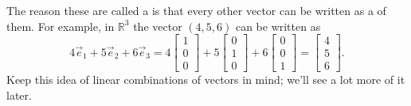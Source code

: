 The reason these are called a \emph{} is that every other
vector can be written as a \emph{} of them.
For example, in ${\mathbb R}^3$ the vector $(4,5,6)$ can be written as
\begin{equation*}
4 \vec{e}_1 + 
5 \vec{e}_2 + 
6 \vec{e}_3
=
4
\begin{bmatrix}
1 \\ 0 \\ 0
\end{bmatrix}
+
5
\begin{bmatrix}
0 \\ 1 \\ 0
\end{bmatrix}
+
6
\begin{bmatrix}
0 \\ 0 \\ 1
\end{bmatrix}
=
\begin{bmatrix}
4 \\ 5 \\ 6
\end{bmatrix} .
\end{equation*}
Keep this idea of linear combinations of vectors in mind; we'll see a lot more of it later.

